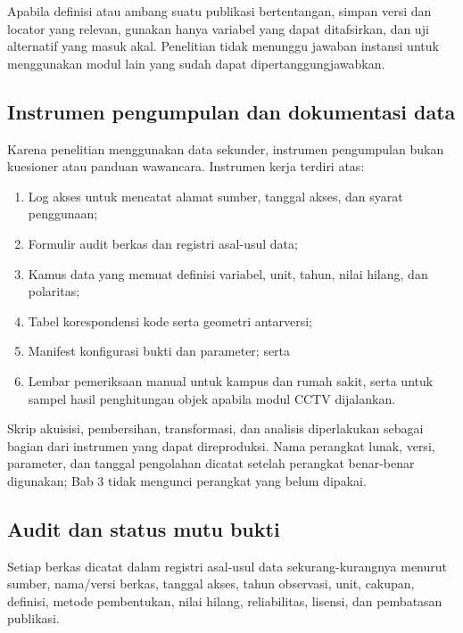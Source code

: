 \documentclass[11pt,a4paper,oneside,openany,indonesian]{report}
\begin{document}
Apabila definisi atau ambang suatu publikasi bertentangan, simpan versi
dan locator yang relevan, gunakan hanya variabel yang dapat ditafsirkan,
dan uji alternatif yang masuk akal. Penelitian tidak menunggu jawaban
instansi untuk menggunakan modul lain yang sudah dapat
dipertanggungjawabkan.

\subsection{Instrumen pengumpulan dan dokumentasi
data}\label{instrumen-pengumpulan-dan-dokumentasi-data}

Karena penelitian menggunakan data sekunder, instrumen pengumpulan bukan
kuesioner atau panduan wawancara. Instrumen kerja terdiri atas:

\begin{enumerate}
\def\labelenumi{\arabic{enumi}.}
\tightlist
\item
  Log akses untuk mencatat alamat sumber, tanggal akses, dan syarat
  penggunaan;
\item
  Formulir audit berkas dan registri asal-usul data;
\item
  Kamus data yang memuat definisi variabel, unit, tahun, nilai hilang,
  dan polaritas;
\item
  Tabel korespondensi kode serta geometri antarversi;
\item
  Manifest konfigurasi bukti dan parameter; serta
\item
  Lembar pemeriksaan manual untuk kampus dan rumah sakit, serta untuk
  sampel hasil penghitungan objek apabila modul CCTV dijalankan.
\end{enumerate}

Skrip akuisisi, pembersihan, transformasi, dan analisis diperlakukan
sebagai bagian dari instrumen yang dapat direproduksi. Nama perangkat
lunak, versi, parameter, dan tanggal pengolahan dicatat setelah
perangkat benar-benar digunakan; Bab 3 tidak mengunci perangkat yang
belum dipakai.

\subsection{Audit dan status mutu
bukti}\label{audit-dan-status-mutu-bukti}

Setiap berkas dicatat dalam registri asal-usul data sekurang-kurangnya
menurut sumber, nama/versi berkas, tanggal akses, tahun observasi, unit,
cakupan, definisi, metode pembentukan, nilai hilang, reliabilitas,
lisensi, dan pembatasan publikasi.
\end{document}
